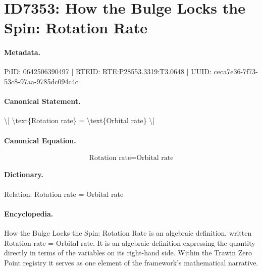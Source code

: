 \section*{ID7353: How the Bulge Locks the Spin: Rotation Rate}
\paragraph{Metadata.}
PiID: 0642506390497 | RTEID: RTE:P28553.3319:T3.0648 | UUID: ceca7e36-7f73-53c8-97aa-9785dc094c4c

\paragraph{Canonical Statement.}
\textbackslash{}[ \textbackslash{}text\{Rotation rate\} = \textbackslash{}text\{Orbital rate\} \textbackslash{}]

\paragraph{Canonical Equation.}
\[
\text{Rotation rate} = \text{Orbital rate}
\]

\paragraph{Dictionary.}
Relation: Rotation rate = Orbital rate

\paragraph{Encyclopedia.}
How the Bulge Locks the Spin: Rotation Rate is an algebraic definition, written Rotation rate = Orbital rate. It is an algebraic definition expressing the quantity directly in terms of the variables on its right-hand side. Within the Trawin Zero Point registry it serves as one element of the framework's mathematical narrative.
